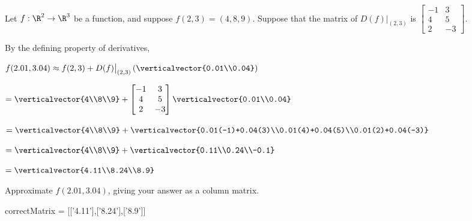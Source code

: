 \documentclass{ximera}
\begin{document}
\begin{question}
	Let $f:\R^2 \to \R^3$ be a function, and suppose $f(2,3) = (4,8,9)$.  Suppose that the matrix of $D(f)\big|_{(2,3)}$ is 
	$\begin{bmatrix} -1 & 3\\ 4& 5 \\ 2 & -3 \end{bmatrix}$.  
	
	\begin{solution}
		\begin{hint}
			By the defining property of derivatives,
			
			$f(2.01,3.04) \approx f(2,3) + D(f)\big|_{(2,3)}\left(\verticalvector{0.01\\0.04}\right)$
		\end{hint}
		\begin{hint}
			 $= \verticalvector{4\\8\\9}+\begin{bmatrix} -1 & 3\\ 4& 5 \\ 2 & -3 \end{bmatrix}\verticalvector{0.01\\0.04}$
		\end{hint}
		\begin{hint}
			 $= \verticalvector{4\\8\\9}+\verticalvector{0.01(-1)+0.04(3)\\0.01(4)+0.04(5)\\0.01(2)+0.04(-3)}$
		\end{hint}
		\begin{hint}
			 $= \verticalvector{4\\8\\9}+\verticalvector{0.11\\0.24\\-0.1}$
		\end{hint}
		\begin{hint}
			 $= \verticalvector{4.11\\8.24\\8.9}$
		\end{hint}
		Approximate $f(2.01,3.04)$, giving your answer as a column matrix.
		\begin{matrix-answer}[name = v]
			correctMatrix = [['4.11'],['8.24'],['8.9']]
		\end{matrix-answer}
	\end{solution}
\end{question}
\end{document}
